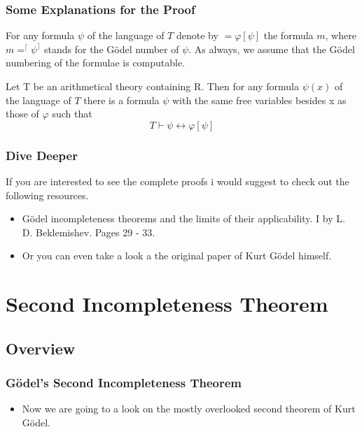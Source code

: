 \documentclass[aspectratio=169]{beamer}
\begin{document}
\begin{frame}
	\frametitle{Some Explanations for the Proof}
	For any formula $\psi$ of the language of $T$ denote by $=\varphi \left[\psi \right]$ the formula \underline{$m$}, where $m = ^{\lceil} \psi ^{\rceil}$ stands for the Gödel number of $\psi$. As always, we assume that the Gödel numbering of the formulae is computable.
	
	\begin{lemma}
		Let T be an arithmetical theory containing R. Then for any formula $\psi(x)$ of the language of $T$ there is a formula $\psi$ with the same free variables besides x as those of $\varphi$ such that
			\[T \vdash \psi \leftrightarrow \varphi[\psi]\]
	\end{lemma}
	\begin{flushright}
		\cite{bekl}
	\end{flushright}
\end{frame}

\begin{frame}
	\frametitle{Dive Deeper}
	If you are interested to see the complete proofs i would suggest to check out the following resources.
	\begin{itemize}
		\item Gödel incompleteness theorems and the limits of their applicability. I by L. D. Beklemishev. Pages 29 - 33. \cite{bekl}
		\item Or you can even take a look a the original paper of Kurt Gödel himself. \cite{godel}  
	\end{itemize}
\end{frame}

\section{Second Incompleteness Theorem}
\subsection{Overview}
\begin{frame}
	\frametitle{Gödel's Second Incompleteness Theorem}
	\begin{itemize}
		\item Now we are going to a look on the mostly overlooked second theorem of Kurt Gödel.
	\end{itemize}
\end{frame}
\end{document}
